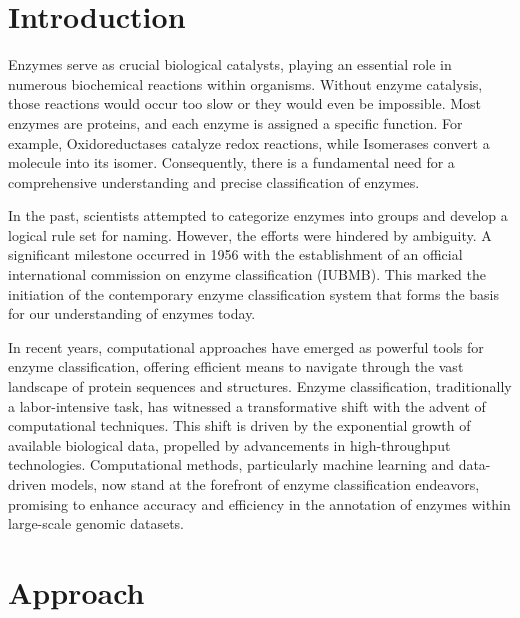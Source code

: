 \documentclass{bioinfo}
\begin{document}
\section{Introduction}

Enzymes serve as crucial biological catalysts, playing an essential role in numerous biochemical reactions within organisms. Without enzyme catalysis, those reactions would occur too slow or they would even be impossible. Most enzymes are proteins, 
and each enzyme is assigned a specific function. For example, Oxidoreductases catalyze redox reactions, 
while Isomerases convert a molecule into its isomer. 
Consequently, there is a fundamental need for a comprehensive understanding and precise classification of enzymes.

In the past, scientists attempted to categorize enzymes into groups and develop a logical rule set for naming. 
However, the efforts were hindered by ambiguity. A significant milestone occurred in 1956 with the establishment of an official international commission on enzyme classification (IUBMB).
This marked the initiation of the contemporary enzyme classification system that forms the basis for our understanding of enzymes today.

In recent years, computational approaches have emerged as powerful tools for enzyme classification, 
offering efficient means to navigate through the vast landscape of protein sequences and structures.
Enzyme classification, traditionally a labor-intensive task, has witnessed a transformative shift with the advent of computational techniques.
This shift is driven by the exponential growth of available biological data, propelled by advancements in high-throughput technologies.
Computational methods, particularly machine learning and data-driven models, now stand at the forefront of enzyme classification endeavors,
promising to enhance accuracy and efficiency in the annotation of enzymes within large-scale genomic datasets.

\section{Approach}
\end{document}
